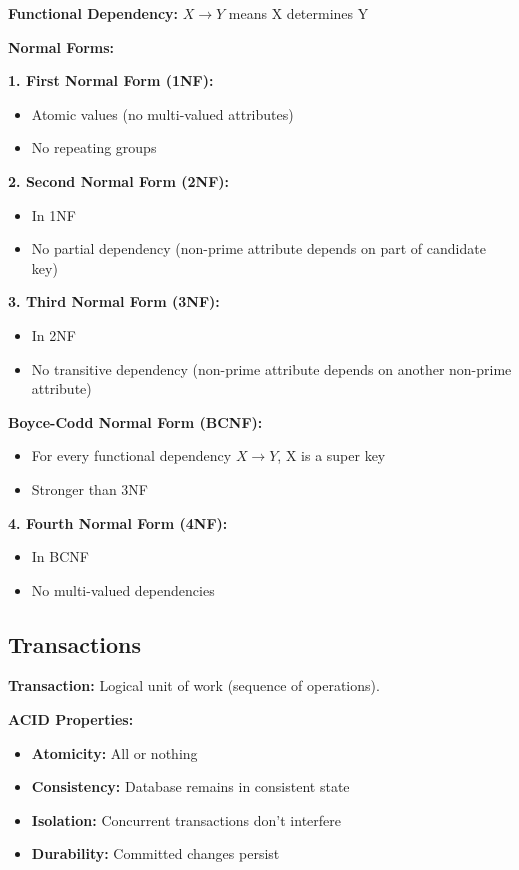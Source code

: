 \documentclass[11pt,a4paper]{article}
\begin{document}
\textbf{Functional Dependency:} $X \rightarrow Y$ means X determines Y

\textbf{Normal Forms:}

\textbf{1. First Normal Form (1NF):}
\begin{itemize}
    \item Atomic values (no multi-valued attributes)
    \item No repeating groups
\end{itemize}

\textbf{2. Second Normal Form (2NF):}
\begin{itemize}
    \item In 1NF
    \item No partial dependency (non-prime attribute depends on part of candidate key)
\end{itemize}

\textbf{3. Third Normal Form (3NF):}
\begin{itemize}
    \item In 2NF
    \item No transitive dependency (non-prime attribute depends on another non-prime attribute)
\end{itemize}

\textbf{Boyce-Codd Normal Form (BCNF):}
\begin{itemize}
    \item For every functional dependency $X \rightarrow Y$, X is a super key
    \item Stronger than 3NF
\end{itemize}

\textbf{4. Fourth Normal Form (4NF):}
\begin{itemize}
    \item In BCNF
    \item No multi-valued dependencies
\end{itemize}

\subsection{Transactions}

\begin{defbox}
\textbf{Transaction:} Logical unit of work (sequence of operations).
\end{defbox}

\textbf{ACID Properties:}
\begin{itemize}
    \item \textbf{Atomicity:} All or nothing
    \item \textbf{Consistency:} Database remains in consistent state
    \item \textbf{Isolation:} Concurrent transactions don't interfere
    \item \textbf{Durability:} Committed changes persist
\end{itemize}
\end{document}
